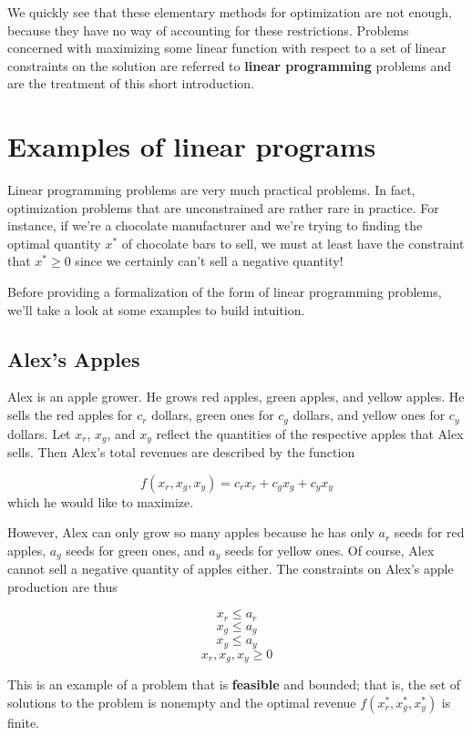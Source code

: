 \documentclass{paper}
\begin{document}
\medskip We quickly see that these elementary methods for optimization are not enough, because they have no way of accounting for these restrictions. Problems concerned with maximizing some linear function with respect to a set of linear constraints on the solution are referred to \textbf{linear programming} problems and are the treatment of this short introduction.

\section{Examples of linear programs}

Linear programming problems are very much practical problems. In fact, optimization problems that are unconstrained are rather rare in practice. For instance, if we're a chocolate manufacturer and we're trying to finding the optimal quantity $x^*$ of chocolate bars to sell, we must at least have the constraint that $x^* \geq 0$ since we certainly can't sell a negative quantity! 

\medskip
Before providing a formalization of the form of linear programming problems, we'll take a look at some examples to build intuition.

\subsection{Alex's Apples}

Alex is an apple grower. He grows red apples, green apples, and yellow apples. He sells the red apples for $c_r$ dollars, green ones for $c_g$ dollars, and yellow ones for $c_y$ dollars. Let $x_r$, $x_g$, and $x_y$ reflect the quantities of the respective apples that Alex sells. Then Alex's total revenues are described by the function 

\[ f(x_r, x_g, x_y) = c_r x_r + c_g x_g + c_y x_y \]
 which he would like to maximize.

\medskip However, Alex can only grow so many apples because he has only $a_r$ seeds for red apples, $a_g$ seeds for green ones, and $a_y$ seeds for yellow ones. Of course, Alex cannot sell a negative quantity of apples either. The constraints on Alex's apple production are thus

\[ x_r \leq a_r \]
\[ x_g \leq a_g \]
\[ x_y \leq a_y \]
\[ x_r, x_g, x_y \geq 0 \]

This is an example of a problem that is \textbf{feasible} and bounded; that is, the set of solutions to the problem is nonempty and the optimal revenue $f(x_r^*, x_g^*, x_y^*)$ is finite.
\end{document}
